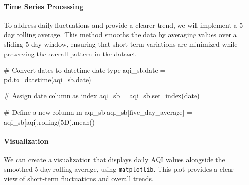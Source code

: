 \documentclass[
  letterpaper,
  DIV=11,
  numbers=noendperiod]{scrartcl}
\let\oldparagraph\paragraph
\renewcommand{\paragraph}[1]{\oldparagraph{#1}\mbox{}}
\newenvironment{Shaded}{\begin{snugshade}}{\end{snugshade}}
\newcommand{\CommentTok}[1]{\textcolor[rgb]{0.37,0.37,0.37}{#1}}
\newcommand{\NormalTok}[1]{\textcolor[rgb]{0.00,0.23,0.31}{#1}}
\newcommand{\OperatorTok}[1]{\textcolor[rgb]{0.37,0.37,0.37}{#1}}
\newcommand{\StringTok}[1]{\textcolor[rgb]{0.13,0.47,0.30}{#1}}
\begin{document}
\hypertarget{time-series-processing}{%
\paragraph{Time Series Processing}\label{time-series-processing}}

To address daily fluctuations and provide a clearer trend, we will
implement a 5-day rolling average. This method smooths the data by
averaging values over a sliding 5-day window, ensuring that short-term
variations are minimized while preserving the overall pattern in the
dataset.

\begin{Shaded}
\begin{Highlighting}[]
\CommentTok{\# Convert dates to datetime date type}
\NormalTok{aqi\_sb.date }\OperatorTok{=}\NormalTok{ pd.to\_datetime(aqi\_sb.date)}
                     
\CommentTok{\# Assign date column as index}
\NormalTok{aqi\_sb }\OperatorTok{=}\NormalTok{ aqi\_sb.set\_index(}\StringTok{\textquotesingle{}date\textquotesingle{}}\NormalTok{)}

\CommentTok{\# Define a new column in aqi\_sb}
\NormalTok{aqi\_sb[}\StringTok{\textquotesingle{}five\_day\_average\textquotesingle{}}\NormalTok{] }\OperatorTok{=}\NormalTok{ aqi\_sb[}\StringTok{\textquotesingle{}aqi\textquotesingle{}}\NormalTok{].rolling(}\StringTok{\textquotesingle{}5D\textquotesingle{}}\NormalTok{).mean()}
\end{Highlighting}
\end{Shaded}

\hypertarget{visualization}{%
\paragraph{Visualization}\label{visualization}}

We can create a visualization that displays daily AQI values alongside
the smoothed 5-day rolling average, using \texttt{matplotlib}. This plot
provides a clear view of short-term fluctuations and overall trends.
\end{document}
